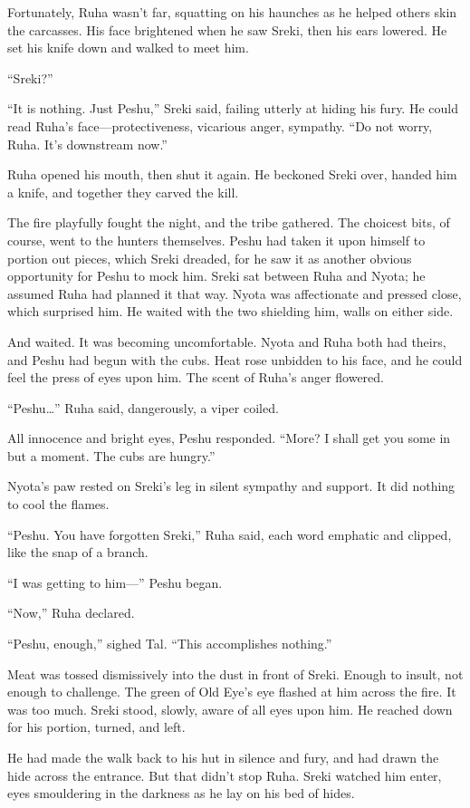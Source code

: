 Fortunately, Ruha wasn't far, squatting on his haunches as he helped others skin the carcasses. His face brightened when he saw Sreki, then his ears lowered. He set his knife down and walked to meet him.

``Sreki?''

``It is nothing. Just Peshu,'' Sreki said, failing utterly at hiding his fury. He could read Ruha's face---protectiveness, vicarious anger, sympathy. ``Do not worry, Ruha. It's downstream now.''

Ruha opened his mouth, then shut it again. He beckoned Sreki over, handed him a knife, and together they carved the kill.

The fire playfully fought the night, and the tribe gathered. The choicest bits, of course, went to the hunters themselves. Peshu had taken it upon himself to portion out pieces, which Sreki dreaded, for he saw it as another obvious opportunity for Peshu to mock him. Sreki sat between Ruha and Nyota; he assumed Ruha had planned it that way. Nyota was affectionate and pressed close, which surprised him. He waited with the two shielding him, walls on either side.

And waited. It was becoming uncomfortable. Nyota and Ruha both had theirs, and Peshu had begun with the cubs. Heat rose unbidden to his face, and he could feel the press of eyes upon him. The scent of Ruha's anger flowered.

``Peshu\ldots'' Ruha said, dangerously, a viper coiled.

All innocence and bright eyes, Peshu responded. ``More? I shall get you some in but a moment. The cubs are hungry.''

Nyota's paw rested on Sreki's leg in silent sympathy and support. It did nothing to cool the flames.

``Peshu. You have forgotten Sreki,'' Ruha said, each word emphatic and clipped, like the snap of a branch.

``I was getting to him---'' Peshu began.

``Now,'' Ruha declared.

``Peshu, enough,'' sighed Tal. ``This accomplishes nothing.''

Meat was tossed dismissively into the dust in front of Sreki. Enough to insult, not enough to challenge. The green of Old Eye's eye flashed at him across the fire. It was too much. Sreki stood, slowly, aware of all eyes upon him. He reached down for his portion, turned, and left.

He had made the walk back to his hut in silence and fury, and had drawn the hide across the entrance. But that didn't stop Ruha. Sreki watched him enter, eyes smouldering in the darkness as he lay on his bed of hides.

